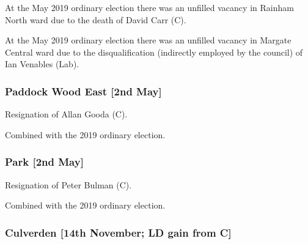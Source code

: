 \begin{resultsiii}

	At the May 2019 ordinary election there was an unfilled vacancy in Rainham North ward due to the death of David Carr (C).


	At the May 2019 ordinary election there was an unfilled vacancy in Margate Central ward due to the disqualification (indirectly employed by the council) of Ian Venables (Lab).


	\subsubsection*{Paddock Wood East \hspace*{\fill}\nolinebreak[1]%
		\enspace\hspace*{\fill}
		[2nd May]}


	Resignation of Allan Gooda (C).

	Combined with the 2019 ordinary election.

	\subsubsection*{Park \hspace*{\fill}\nolinebreak[1]%
		\enspace\hspace*{\fill}
		[2nd May]}


	Resignation of Peter Bulman (C).

	Combined with the 2019 ordinary election.

	\subsubsection*{Culverden \hspace*{\fill}\nolinebreak[1]%
		\enspace\hspace*{\fill}
		[14th November; LD gain from C]}



\end{resultsiii}
